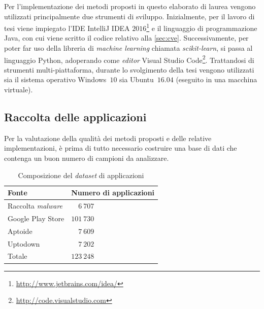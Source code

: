 \documentclass[12pt,a4paper,oneside]{article}
\begin{document}
Per l'implementazione dei metodi proposti in questo elaborato di laurea vengono utilizzati principalmente due strumenti di sviluppo. Inizialmente, per il lavoro di tesi viene impiegato l'\gls{IDE} IntelliJ IDEA $2016$\footnote{\hspace{.175em}\url{http://www.jetbrains.com/idea/}} e il linguaggio di programmazione Java, con cui viene scritto il codice relativo alla \cref{sec:cve}. Successivamente, per poter far uso della libreria di \textit{machine learning} chiamata \mbox{\textit{scikit-learn}}, si passa al linguaggio Python, adoperando come \textit{editor} Visual Studio Code\footnote{\hspace{.175em}\url{http://code.visualstudio.com}}. Trattandosi di strumenti multi-piattaforma, durante lo svolgimento della tesi vengono utilizzati sia il sistema operativo Windows~$10$ sia Ubuntu~$16.04$ (eseguito in una macchina virtuale).



\subsection{Raccolta delle applicazioni}\label{sec:dataset}

Per la valutazione della qualità dei metodi proposti e delle relative implementazioni, è prima di tutto necessario costruire una base di dati che contenga un buon numero di campioni da analizzare.

\begin{table}[!htb]
    \renewcommand{\arraystretch}{1.3}
    \centering
    \begin{tabular}{|>{\centering\arraybackslash}m{}||>{\centering\arraybackslash}m{}|}
        \hline
        Fonte & Numero di applicazioni\\
        \hline\hline
        Raccolta \textit{malware} & $\hspace{1em}6~707$\\\hline
        Google Play Store\tablefootnote{\url{http://play.google.com/store/apps}} & $101~730$\\\hline
        Aptoide\tablefootnote{\url{http://www.aptoide.com/page/apps}} & $\hspace{1em}7~609$\\\hline
        Uptodown\tablefootnote{\url{http://en.uptodown.com/android}} & $\hspace{1em}7~202$\\\hline\hline
        Totale & $123~248$\\\hline
    \end{tabular}
    \caption{Composizione del \textit{dataset} di applicazioni}
    \label{tab:APK_dataset}
\end{table}
\end{document}
